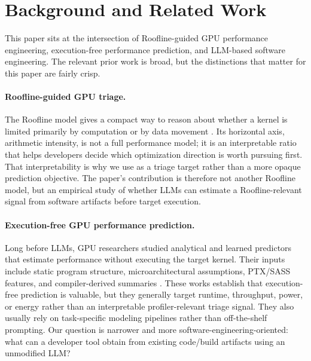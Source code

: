\section{Background and Related Work}
\label{sec:related-work}

This paper sits at the intersection of Roofline-guided GPU performance engineering, execution-free performance prediction, and LLM-based software engineering.
The relevant prior work is broad, but the distinctions that matter for this paper are fairly crisp.

\paragraph{Roofline-guided GPU triage.}
The Roofline model gives a compact way to reason about whether a kernel is limited primarily by computation or by data movement \cite{samuelwilliamsRooflineInsightfulVisual2009}.
Its horizontal axis, arithmetic intensity, is not a full performance model; it is an interpretable ratio that helps developers decide which optimization direction is worth pursuing first.
That interpretability is why we use \rai as a triage target rather than a more opaque prediction objective.
The paper's contribution is therefore not another Roofline model, but an empirical study of whether LLMs can estimate a Roofline-relevant signal from software artifacts before target execution.

\paragraph{Execution-free GPU performance prediction.}
Long before LLMs, GPU researchers studied analytical and learned predictors that estimate performance without executing the target kernel.
Their inputs include static program structure, microarchitectural assumptions, PTX/SASS features, and compiler-derived summaries \cite{hongAnalyticalModelGPU2009,baghsorkhiAdaptivePerformanceModeling2010,alavaniPredictingExecutionTime2018,guerreiroGPUStaticModeling2019a,braunSimpleModelPortable2021,emondsCUDAsapStaticallyDeterminedExecution2023,tranAccurateLatencyPredictor2025}.
These works establish that execution-free prediction is valuable, but they generally target runtime, throughput, power, or energy rather than an interpretable profiler-relevant triage signal.
They also usually rely on task-specific modeling pipelines rather than off-the-shelf prompting.
Our question is narrower and more software-engineering-oriented: what can a developer tool obtain from existing code/build artifacts using an unmodified LLM?

